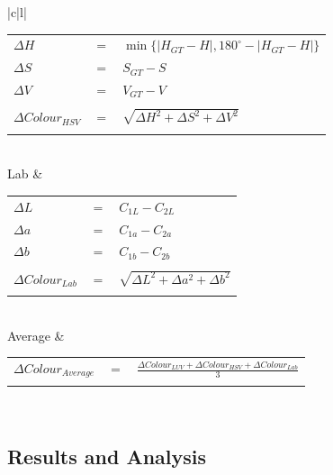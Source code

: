 \begin{table}[tb!]
\begin{tabular}{|c|l|}
\begin{tabular}{lcl}
$\Delta{H}$ & $=$ & $\min\{ \mid H_{GT} - H \mid,  180^{\circ} - \mid H_{GT} - H \mid  \}$ \\
$\Delta{S}$ & $=$ & $S_{GT} - S$ \\
$\Delta{V}$ &  $=$ & $V_{GT} - V$ \\
\\
$\Delta Colour_{HSV}$ & $=$ & $\sqrt{\Delta{H}^{2} + \Delta{S}^{2}  + \Delta{V}^{2} }$
\\
\hspace{4em}& & \\
\end{tabular}\\
\hline
Lab &
\begin{tabular}{lcl}
\\
$\Delta L$ & $=$ & $C_{1L} - C_{2L}$\\
$\Delta a$ & $=$ & $C_{1a} - C_{2a}$\\
$\Delta b$ & $=$ & $C_{1b} - C_{2b}$\\
\\
$\Delta{Colour_{Lab}}$ & $=$ & $\sqrt{\Delta{L}^{2} + \Delta{a}^{2}  + \Delta{b}^{2} }$
\\
\hspace{5em}& & \\
\end{tabular}\\
\hline
Average &
\begin{tabular}{lcl}
\\
$\Delta{Colour_{Average}}$ & $=$ & $\frac{\Delta{Colour_{LUV}} + \Delta{Colour_{HSV}} + \Delta{Colour_{Lab}}}{3}$
\\
\hspace{4em}& & \\
\end{tabular}\\
\hline
\end{tabular}
\label{table:ColorVariation}
\end{table}

\vspace{1em}
\subsection{Results and Analysis}

